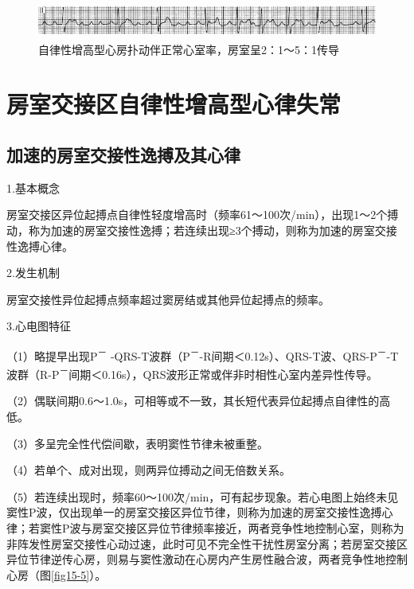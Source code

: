 \begin{figure}[!htbp]
 \centering
 \includegraphics[width=5.58333in,height=0.46875in]{./images/Image00270.jpg}
 \captionsetup{justification=centering}
 \caption{自律性增高型心房扑动伴正常心室率，房室呈2：1～5：1传导}
 \label{fig15-4}
  \end{figure} 

\protect\hypertarget{text00022.htmlux5cux23subid267}{}{}

\section{房室交接区自律性增高型心律失常}

\protect\hypertarget{text00022.htmlux5cux23subid268}{}{}

\subsection{加速的房室交接性逸搏及其心律}

1.基本概念

房室交接区异位起搏点自律性轻度增高时（频率61～100次/min），出现1～2个搏动，称为加速的房室交接性逸搏；若连续出现≥3个搏动，则称为加速的房室交接性逸搏心律。

2.发生机制

房室交接性异位起搏点频率超过窦房结或其他异位起搏点的频率。

3.心电图特征

（1）略提早出现P\textsuperscript{－} -QRS-T波群（P\textsuperscript{－}-R间期＜0.12s）、QRS-T波、QRS-P\textsuperscript{－}-T波群（R-P\textsuperscript{－}间期＜0.16s），QRS波形正常或伴非时相性心室内差异性传导。

（2）偶联间期0.6～1.0s，可相等或不一致，其长短代表异位起搏点自律性的高低。

（3）多呈完全性代偿间歇，表明窦性节律未被重整。

（4）若单个、成对出现，则两异位搏动之间无倍数关系。

（5）若连续出现时，频率60～100次/min，可有起步现象。若心电图上始终未见窦性P波，仅出现单一的房室交接区异位节律，则称为加速的房室交接性逸搏心律；若窦性P波与房室交接区异位节律频率接近，两者竞争性地控制心室，则称为非阵发性房室交接性心动过速，此时可见不完全性干扰性房室分离；若房室交接区异位节律逆传心房，则易与窦性激动在心房内产生房性融合波，两者竞争性地控制心房（图\ref{fig15-5}）。

